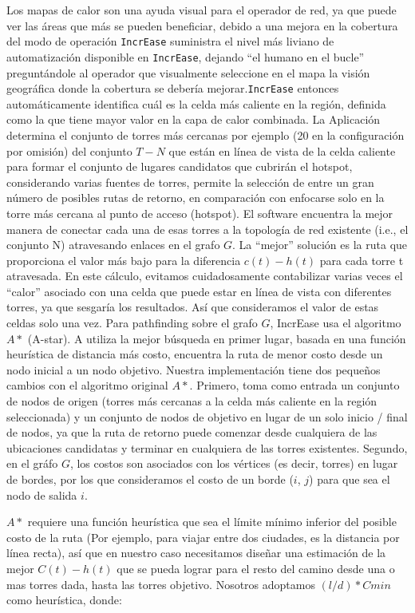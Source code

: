 \documentclass[]{article}
\begin{document}
Los mapas de calor son una ayuda visual para el operador de red, ya que
puede ver las áreas que más se pueden beneficiar, debido a una mejora en
la cobertura del modo de operación \texttt{IncrEase} suministra el nivel
más liviano de automatización disponible en \texttt{IncrEase}, dejando
``el humano en el bucle'' preguntándole al operador que visualmente
seleccione en el mapa la visión geográfica donde la cobertura se debería
mejorar.\texttt{IncrEase} entonces automáticamente identifica cuál es la
celda más caliente en la región, definida como la que tiene mayor valor
en la capa de calor combinada. La Aplicación determina el conjunto de
torres más cercanas por ejemplo (20 en la configuración por omisión) del
conjunto \(T-N\) que están en línea de vista de la celda caliente para
formar el conjunto de lugares candidatos que cubrirán el hotspot,
considerando varias fuentes de torres, permite la selección de entre un
gran número de posibles rutas de retorno, en comparación con enfocarse
solo en la torre más cercana al punto de acceso (hotspot). El software
encuentra la mejor manera de conectar cada una de esas torres a la
topología de red existente (i.e., el conjunto N) atravesando enlaces en
el grafo \(G\). La ``mejor'' solución es la ruta que proporciona el
valor más bajo para la diferencia \(c(t) - h(t)\) para cada torre t
atravesada. En este cálculo, evitamos cuidadosamente contabilizar varias
veces el ``calor'' asociado con una celda que puede estar en línea de
vista con diferentes torres, ya que sesgaría los resultados. Así que
consideramos el valor de estas celdas solo una vez. Para pathfinding
sobre el grafo \(G\), IncrEase usa el algoritmo \(A *\) (A-star). A
utiliza la mejor búsqueda en primer lugar, basada en una función
heurística de distancia más costo, encuentra la ruta de menor costo
desde un nodo inicial a un nodo objetivo. Nuestra implementación tiene
dos pequeños cambios con el algoritmo original \(A *\). Primero, toma
como entrada un conjunto de nodos de origen (torres más cercanas a la
celda más caliente en la región seleccionada) y un conjunto de nodos de
objetivo en lugar de un solo inicio / final de nodos, ya que la ruta de
retorno puede comenzar desde cualquiera de las ubicaciones candidatas y
terminar en cualquiera de las torres existentes. Segundo, en el gráfo
\(G\), los costos son asociados con los vértices (es decir, torres) en
lugar de bordes, por los que consideramos el costo de un borde (\(i\),
\(j\)) para que sea el nodo de salida \(i\).

\(A*\) requiere una función heurística que sea el límite mínimo inferior
del posible costo de la ruta (Por ejemplo, para viajar entre dos
ciudades, es la distancia por línea recta), así que en nuestro caso
necesitamos diseñar una estimación de la mejor \(C(t)-h(t)\) que se
pueda lograr para el resto del camino desde una o mas torres dada, hasta
las torres objetivo. Nosotros adoptamos \((l/d)*Cmin\) como heurística,
donde:
\end{document}
